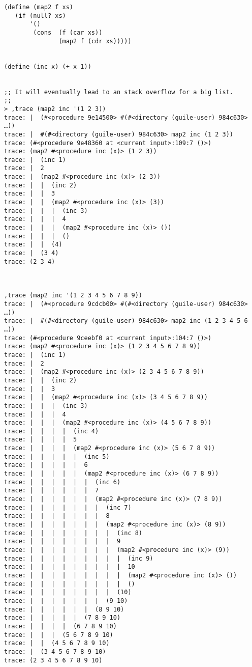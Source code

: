 \documentclass[11pt]{article}
\begin{document}
\begin{verbatim}
(define (map2 f xs)
   (if (null? xs)
       '() 
        (cons  (f (car xs)) 
               (map2 f (cdr xs)))))


(define (inc x) (+ x 1))


;; It will eventually lead to an stack overflow for a big list. 
;;
> ,trace (map2 inc '(1 2 3))
trace: |  (#<procedure 9e14500> #(#<directory (guile-user) 984c630> …))
trace: |  #(#<directory (guile-user) 984c630> map2 inc (1 2 3))
trace: (#<procedure 9e48360 at <current input>:109:7 ()>)
trace: (map2 #<procedure inc (x)> (1 2 3))
trace: |  (inc 1)
trace: |  2
trace: |  (map2 #<procedure inc (x)> (2 3))
trace: |  |  (inc 2)
trace: |  |  3
trace: |  |  (map2 #<procedure inc (x)> (3))
trace: |  |  |  (inc 3)
trace: |  |  |  4
trace: |  |  |  (map2 #<procedure inc (x)> ())
trace: |  |  |  ()
trace: |  |  (4)
trace: |  (3 4)
trace: (2 3 4)



,trace (map2 inc '(1 2 3 4 5 6 7 8 9))
trace: |  (#<procedure 9cdcb00> #(#<directory (guile-user) 984c630> …))
trace: |  #(#<directory (guile-user) 984c630> map2 inc (1 2 3 4 5 6 …))
trace: (#<procedure 9ceebf0 at <current input>:104:7 ()>)
trace: (map2 #<procedure inc (x)> (1 2 3 4 5 6 7 8 9))
trace: |  (inc 1)
trace: |  2
trace: |  (map2 #<procedure inc (x)> (2 3 4 5 6 7 8 9))
trace: |  |  (inc 2)
trace: |  |  3
trace: |  |  (map2 #<procedure inc (x)> (3 4 5 6 7 8 9))
trace: |  |  |  (inc 3)
trace: |  |  |  4
trace: |  |  |  (map2 #<procedure inc (x)> (4 5 6 7 8 9))
trace: |  |  |  |  (inc 4)
trace: |  |  |  |  5
trace: |  |  |  |  (map2 #<procedure inc (x)> (5 6 7 8 9))
trace: |  |  |  |  |  (inc 5)
trace: |  |  |  |  |  6
trace: |  |  |  |  |  (map2 #<procedure inc (x)> (6 7 8 9))
trace: |  |  |  |  |  |  (inc 6)
trace: |  |  |  |  |  |  7
trace: |  |  |  |  |  |  (map2 #<procedure inc (x)> (7 8 9))
trace: |  |  |  |  |  |  |  (inc 7)
trace: |  |  |  |  |  |  |  8
trace: |  |  |  |  |  |  |  (map2 #<procedure inc (x)> (8 9))
trace: |  |  |  |  |  |  |  |  (inc 8)
trace: |  |  |  |  |  |  |  |  9
trace: |  |  |  |  |  |  |  |  (map2 #<procedure inc (x)> (9))
trace: |  |  |  |  |  |  |  |  |  (inc 9)
trace: |  |  |  |  |  |  |  |  |  10
trace: |  |  |  |  |  |  |  |  |  (map2 #<procedure inc (x)> ())
trace: |  |  |  |  |  |  |  |  |  ()
trace: |  |  |  |  |  |  |  |  (10)
trace: |  |  |  |  |  |  |  (9 10)
trace: |  |  |  |  |  |  (8 9 10)
trace: |  |  |  |  |  (7 8 9 10)
trace: |  |  |  |  (6 7 8 9 10)
trace: |  |  |  (5 6 7 8 9 10)
trace: |  |  (4 5 6 7 8 9 10)
trace: |  (3 4 5 6 7 8 9 10)
trace: (2 3 4 5 6 7 8 9 10)



\end{verbatim}
\end{document}

